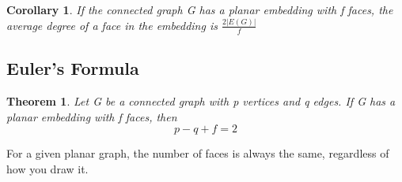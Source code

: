 \documentclass[10pt, a4paper]{article}
\newtheorem*{thm}{Theorem}
\newtheorem*{corol}{Corollary}
\begin{document}
\begin{corol}
    If the connected graph G has a planar embedding with f faces, the average degree of a face in the embedding is $\frac{2|E(G)|}{f}$
\end{corol}

\subsection{Euler's Formula}
\begin{thm}
    Let G be a connected graph with p vertices and q edges. If G has a planar embedding with f faces, then
    \[p-q+f = 2\]
\end{thm}
\begin{term}
    For a given planar graph, the number of faces is always the same, regardless of how you draw it.
\end{term}
\end{document}
